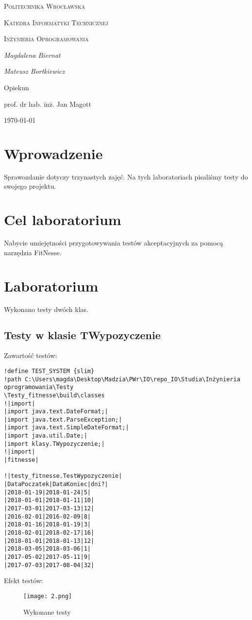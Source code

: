 \documentclass{article}
\begin{document}
	
	\begin{titlepage}
		\centering
		{\scshape\LARGE Politechnika Wrocławska \par}
		{\scshape\Large Katedra Informatyki Technicznej\par}
		
		\vspace{1cm}
		{\scshape\Large Inżynieria Oprogramowania\par}
		\vspace{1.5cm}
		{\huge\bfseries \par}
		\vspace{2cm}
		{\Large\itshape Magdalena Biernat\par}
		{\Large\itshape Mateusz Bortkiewicz\par}
		\vfill
		Opiekun\par
		prof. dr hab. inż. Jan Magott 
		
		\vfill
		{\large \today\par}
	\end{titlepage}
	\newpage
	\section{Wprowadzenie}
	Sprawozdanie dotyczy trzynastych zajęć. Na tych laboratoriach pisaliśmy testy do swojego projektu. 
	
	\section{Cel laboratorium}
Nabycie umiejętności przygotowywania testów akceptacyjnych za pomocą narzędzia FitNesse.
\section{Laboratorium}
Wykonano testy dwóch klas.
\subsection{Testy w klasie TWypozyczenie}
Zawartość testów:
\begin{verbatim}
!define TEST_SYSTEM {slim}
!path C:\Users\magda\Desktop\Madzia\PWr\IO\repo_IO\Studia\Inżynieria oprogramowania\Testy
\Testy_fitnesse\build\classes
!|import|
|import java.text.DateFormat;|
|import java.text.ParseException;|
|import java.text.SimpleDateFormat;|
|import java.util.Date;|
|import klasy.TWypozyczenie;|
!|import|
|fitnesse|

!|testy_fitnesse.TestWypozyczenie|
|DataPoczatek|DataKoniec|dni?|
|2018-01-19|2018-01-24|5|
|2018-01-01|2018-01-11|10|
|2017-03-01|2017-03-13|12|
|2016-02-01|2016-02-09|8|
|2018-01-16|2018-01-19|3|
|2018-02-01|2018-02-17|16|
|2018-01-01|2018-01-13|12|
|2018-03-05|2018-03-06|1|
|2017-05-02|2017-05-11|9|
|2017-07-03|2017-08-04|32|
\end{verbatim}
\newpage
Efekt testów:
	\begin{figure}[!ht]
	\centering
	\texttt{[image: 2.png]}
	\caption{Wykonane testy}
	\label{fig:obrazek 1}
	\newpage
\end{figure}
\end{document}
